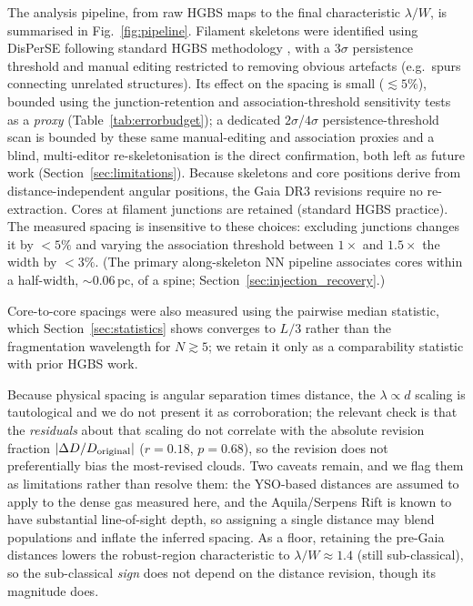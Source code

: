 \documentclass[usenatbib,twoside,twocolumn]{mnras}
\begin{document}
The analysis pipeline, from raw HGBS maps to the final characteristic $\lambda/W$, is summarised in Fig.~\ref{fig:pipeline}. Filament skeletons were identified using DisPerSE \citep{Sousbie2011} following standard HGBS methodology \citep{Arzoumanian2011}, with a $3\sigma$ persistence threshold and manual editing restricted to removing obvious artefacts (e.g.\ spurs connecting unrelated structures). Its effect on the spacing is small ($\lesssim5\%$), bounded using the junction-retention and association-threshold sensitivity tests as a \emph{proxy} (Table~\ref{tab:errorbudget}); a dedicated $2\sigma$/$4\sigma$ persistence-threshold scan is bounded by these same manual-editing and association proxies and a blind, multi-editor re-skeletonisation is the direct confirmation, both left as future work (Section~\ref{sec:limitations}). Because skeletons and core positions derive from distance-independent angular positions, the Gaia DR3 revisions require no re-extraction. Cores at filament junctions are retained (standard HGBS practice). The measured spacing is insensitive to these choices: excluding junctions changes it by $<5\%$ and varying the association threshold between $1\times$ and $1.5\times$ the width by $<3\%$. (The primary along-skeleton NN pipeline associates cores within a half-width, $\sim0.06$\,pc, of a spine; Section~\ref{sec:injection_recovery}.)

Core-to-core spacings were also measured using the pairwise median statistic, which Section~\ref{sec:statistics} shows converges to $L/3$ rather than the fragmentation wavelength for $N\gtrsim5$; we retain it only as a comparability statistic with prior HGBS work.

Because physical spacing is angular separation times distance, the $\lambda\propto d$ scaling is tautological and we do not present it as corroboration; the relevant check is that the \emph{residuals} about that scaling do not correlate with the absolute revision fraction $|\Delta D/D_{\rm original}|$ ($r=0.18$, $p=0.68$), so the revision does not preferentially bias the most-revised clouds. Two caveats remain, and we flag them as limitations rather than resolve them: the YSO-based distances \citep{Zhang2023} are assumed to apply to the dense gas measured here, and the Aquila/Serpens Rift is known to have substantial line-of-sight depth, so assigning a single distance may blend populations and inflate the inferred spacing. As a floor, retaining the pre-Gaia distances lowers the robust-region characteristic to $\lambda/W\approx1.4$ (still sub-classical), so the sub-classical \emph{sign} does not depend on the distance revision, though its magnitude does.
\end{document}
